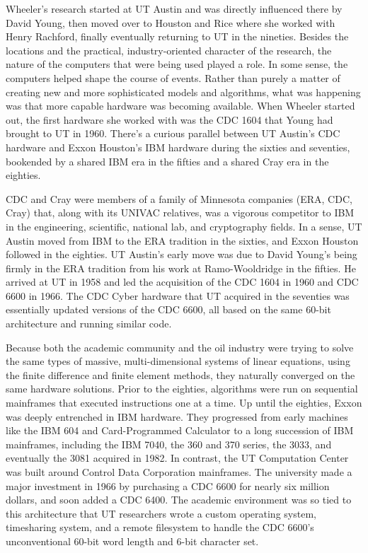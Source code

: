 Wheeler’s research started at UT Austin and was directly influenced there by David Young, then moved over to Houston and Rice where she worked with Henry Rachford, finally eventually returning to UT in the nineties. Besides the locations and the practical, industry-oriented character of the research, the nature of the computers that were being used played a role. In some sense, the computers helped shape the course of events. Rather than purely a matter of creating new and more sophisticated models and algorithms, what was happening was that more capable hardware was becoming available. When Wheeler started out, the first hardware she worked with was the CDC 1604 that Young had brought to UT in 1960. There's a curious parallel between UT Austin's CDC hardware and Exxon Houston's IBM hardware during the sixties and seventies, bookended by a shared IBM era in the fifties and a shared Cray era in the eighties.
 
CDC and Cray were members of a family of Minnesota companies (ERA, CDC, Cray) that, along with its UNIVAC relatives, was a vigorous competitor to IBM in the engineering, scientific, national lab, and cryptography fields. In a sense, UT Austin moved from IBM to the ERA tradition in the sixties, and Exxon Houston followed in the eighties. UT Austin's early move was due to David Young's being firmly in the ERA tradition from his work at Ramo-Wooldridge in the fifties. He arrived at UT in 1958 and led the acquisition of the CDC 1604 in 1960 and CDC 6600 in 1966. The CDC Cyber hardware that UT acquired in the seventies was essentially updated versions of the CDC 6600, all based on the same 60-bit architecture and running similar code.

Because both the academic community and the oil industry were trying to solve the same types of massive, multi-dimensional systems of linear equations, using the finite difference and finite element methods, they naturally converged on the same hardware solutions. Prior to the eighties, algorithms were run on sequential mainframes that executed instructions one at a time. Up until the eighties, Exxon was deeply entrenched in IBM hardware. They progressed from early machines like the IBM 604 and Card-Programmed Calculator to a long succession of IBM mainframes, including the IBM 7040, the 360 and 370 series, the 3033, and eventually the 3081 acquired in 1982. In contrast, the UT Computation Center was built around Control Data Corporation mainframes. The university made a major investment in 1966 by purchasing a CDC 6600 for nearly six million dollars, and soon added a CDC 6400. The academic environment was so tied to this architecture that UT researchers wrote a custom operating system, timesharing system, and a remote filesystem to handle the CDC 6600's unconventional 60-bit word length and 6-bit character set.

